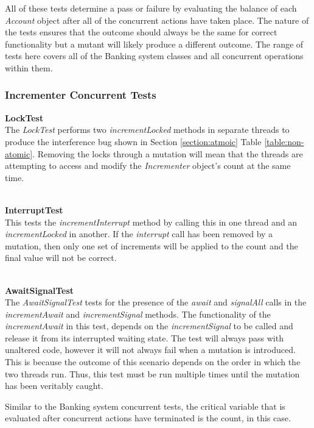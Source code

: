 \documentclass[a4paper,12pt]{article}
\begin{document}
All of these tests determine a pass or failure by evaluating the balance of each \textit{Account} object after all of the concurrent actions have taken place. The nature of the tests ensures that the outcome should always be the same for correct functionality but a mutant will likely produce a different outcome. The range of tests here covers all of the Banking system classes and all concurrent operations within them.

\subsubsection{Incrementer Concurrent Tests}

\textbf{LockTest}
\\The \textit{LockTest} performs two \textit{incrementLocked} methods in separate threads to produce the interference bug shown in Section \ref{section:atmoic} Table \ref{table:non-atomic}. Removing the locks through a mutation will mean that the threads are attempting to access and modify the \textit{Incrementer} object's count at the same time. 

\textbf{\\InterruptTest}
\\This tests the \textit{incrementInterrupt} method by calling this in one thread and an \textit{incrementLocked} in another. If the \textit{interrupt} call has been removed by a mutation, then only one set of increments will be applied to the count and the final value will not be correct. 

\textbf{\\AwaitSignalTest}
\\The \textit{AwaitSignalTest} tests for the presence of the \textit{await} and \textit{signalAll} calls in the \textit{incrementAwait} and \textit{incrementSignal} methods. The functionality of the \textit{incrementAwait} in this test, depends on the \textit{incrementSignal} to be called and release it from its interrupted waiting state. The test will always pass with unaltered code, however it will not always fail when a mutation is introduced. This is because the outcome of this scenario depends on the order in which the two threads run. Thus, this test must be run multiple times until the mutation has been veritably caught. 

Similar to the Banking system concurrent tests, the critical variable that is evaluated after concurrent actions have terminated is the count, in this case.   
\end{document}
